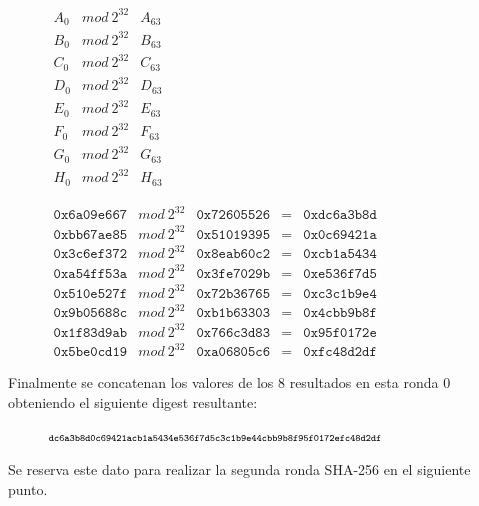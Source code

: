 \documentclass{article}
\begin{document}
    \begin{figure}[H]
    \centering
        $\begin{array}{lll}
            A_0 & mod\ 2^{32} & A_{63} \\
            B_0 & mod\ 2^{32} & B_{63} \\
            C_0 & mod\ 2^{32} & C_{63} \\
            D_0 & mod\ 2^{32} & D_{63} \\
            E_0 & mod\ 2^{32} & E_{63} \\
            F_0 & mod\ 2^{32} & F_{63} \\
            G_0 & mod\ 2^{32} & G_{63} \\
            H_0 & mod\ 2^{32} & H_{63}
        \end{array}$
    \end{figure}
    
    \begin{figure}[H]
    \centering
        $\begin{array}{lllll}
            \texttt{0x6a09e667} & mod\ 2^{32} & \texttt{0x72605526} & = & \texttt{0xdc6a3b8d} \\
            \texttt{0xbb67ae85} & mod\ 2^{32} & \texttt{0x51019395} & = & \texttt{0x0c69421a} \\
            \texttt{0x3c6ef372} & mod\ 2^{32} & \texttt{0x8eab60c2} & = & \texttt{0xcb1a5434} \\
            \texttt{0xa54ff53a} & mod\ 2^{32} & \texttt{0x3fe7029b} & = & \texttt{0xe536f7d5} \\
            \texttt{0x510e527f} & mod\ 2^{32} & \texttt{0x72b36765} & = & \texttt{0xc3c1b9e4} \\
            \texttt{0x9b05688c} & mod\ 2^{32} & \texttt{0xb1b63303} & = & \texttt{0x4cbb9b8f} \\
            \texttt{0x1f83d9ab} & mod\ 2^{32} & \texttt{0x766c3d83} & = & \texttt{0x95f0172e} \\
            \texttt{0x5be0cd19} & mod\ 2^{32} & \texttt{0xa06805c6} & = & \texttt{0xfc48d2df}
        \end{array}$
    \end{figure}
    
    Finalmente se concatenan los valores de los 8 resultados en esta ronda 0 obteniendo el siguiente digest resultante:
    
    \begin{figure}[H]
    \centering
        $\scriptsize{\texttt{dc6a3b8d0c69421acb1a5434e536f7d5c3c1b9e44cbb9b8f95f0172efc48d2df}}$
    \end{figure}
    Se reserva este dato para realizar la segunda ronda SHA-256 en el siguiente punto.
    
\end{document}
